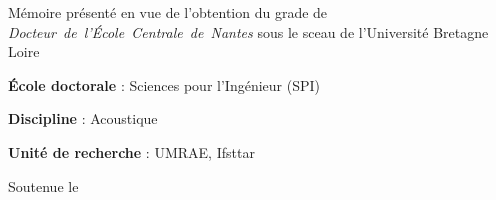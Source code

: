 \begin{cover}

  
  \noindent
  \begin{minipage}{8.4cm} %
    \noindent
    Mémoire présenté en vue de l'obtention du grade de \mbox{\emph{Docteur de l'\'Ecole Centrale de Nantes}} sous le sceau de l'Université Bretagne Loire
    \bigskip

    \noindent
    \textbf{\'Ecole doctorale} : Sciences pour l'Ingénieur (SPI)
    \medskip

    \noindent
    \textbf{Discipline} : Acoustique
    \medskip

    \noindent
    \textbf{Unité de recherche} : UMRAE, Ifsttar
    \medskip

    \noindent
    Soutenue le %
  \end{minipage}


  \begin{center}
    \scshape\color{titlecolor}%
    {\LARGE\bfseries\thesisTitle\bigskip}

  \end{center}



\end{cover}
